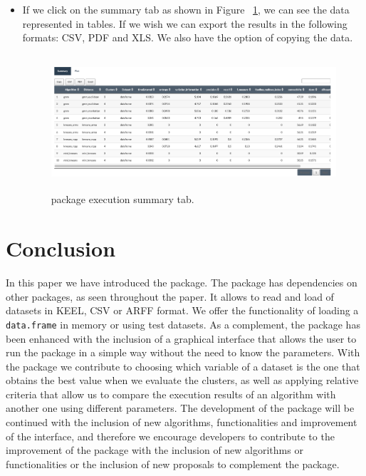 \begin{enumerate}
\begin{itemize}
    \item If we click on the summary tab as shown in Figure ~\ref{fig:tab_summary}, we can see the data represented in tables. If we wish we can export the results in the following formats: CSV, PDF and XLS. We also have the option of copying the data.

  \begin{figure}[htbp]
    \centering
     \includegraphics[width=14cm, height=5cm]{img/tab_summary}
      \caption{ package execution summary tab.}
      \label{fig:tab_summary}
  \end{figure}

  \end{itemize}

\end{enumerate}
\section{Conclusion}

In this paper we have introduced the  package. The package has dependencies on other packages, as seen throughout the paper. It allows to read and load of datasets in KEEL, CSV or ARFF format. We offer the functionality of loading a \texttt{data.frame} in memory or using test datasets. As a complement, the package has been enhanced with the inclusion of a graphical interface that allows the user to run the package in a simple way without the need to know the parameters. With the package we contribute to choosing which variable of a dataset is the one that obtains the best value when we evaluate the clusters, as well as applying relative criteria that allow us to compare the execution results of an algorithm with another one using different parameters. The development of the package will be continued with the inclusion of new algorithms, functionalities and improvement of the interface, and therefore we encourage developers to contribute to the improvement of the package with the inclusion of new algorithms or functionalities or the inclusion of new proposals to complement the package.

